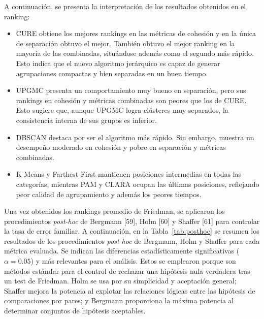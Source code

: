 A continuaci\'on, se presenta la interpretaci\'on de los resultados obtenidos en el ranking:

\begin{itemize}
  \item CURE obtiene los mejores rankings en las m\'etricas de cohesi\'on y en la \'unica de separaci\'on obtuvo el mejor. Tambi\'en obtuvo el mejor ranking en la mayor\'ia de las combinadas, situ\'andose adem\'as como el segundo m\'as r\'apido. Esto indica que el nuevo algoritmo jer\'arquico es capaz de generar agrupaciones compactas y bien separadas en un buen tiempo.
  \item UPGMC presenta un comportamiento muy bueno en separaci\'on, pero sus rankings en cohesi\'on y m\'etricas combinadas son peores que los de CURE. Esto sugiere que, aunque UPGMC logra cl\'usteres muy separados, la consistencia interna de sus grupos es inferior.
  \item DBSCAN destaca por ser el algoritmo m\'as r\'apido. Sin embargo, muestra un desempe\~no moderado en cohesi\'on y pobre en separaci\'on y m\'etricas combinadas.
  \item K-Means y Farthest-First mantienen posiciones intermedias en todas las categor\'ias, mientras PAM y CLARA ocupan las \'ultimas posiciones, reflejando peor calidad de agrupamiento y adem\'as los peores tiempos.
\end{itemize}

Una vez obtenidos los rankings promedio de Friedman, se aplicaron los procedimientos \textit{post-hoc} de Bergmann [59], Holm [60] y Shaffer [61] para controlar la tasa de error familiar. A continuaci\'on, en la Tabla~\ref{tab:posthoc} se resumen los resultados de los procedimientos \textit{post hoc} de Bergmann, Holm y Shaffer para cada m\'etrica evaluada. Se indican las diferencias estad\'isticamente significativas ($\alpha=0.05$) y m\'as relevantes para el an\'alisis. Estos se emplearon porque son m\'etodos est\'andar para el control de rechazar una hip\'otesis nula verdadera tras un test de Friedman. Holm se usa por su simplicidad y aceptaci\'on general; Shaffer mejora la potencia al explotar las relaciones l\'ogicas entre las hip\'otesis de comparaciones por pares; y Bergmann proporciona la m\'axima potencia al determinar conjuntos de hip\'otesis aceptables.

